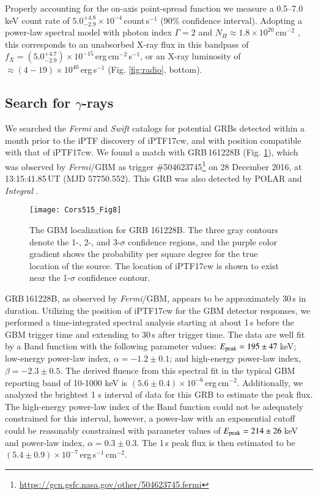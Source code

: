 \documentclass[twocolumn]{emulateapj}
\begin{document}
Properly accounting for the on-axis point-spread function we
measure a 0.5--7.0\,keV count rate of $5.0_{-2.9}^{+4.8} \times
10^{-4}$\,count\,s$^{-1}$ (90\% confidence interval).  Adopting a
power-law spectral model with photon index $\Gamma = 2$ and 
$N_H\approx 1.8\times10^{20}$\,cm$^{-2}$ \citep{Dickey1990}, this
corresponds to an unabsorbed X-ray flux in this bandpass of
$f_{X} = \left(5.0_{-2.9}^{+4.7}\right) \times 10^{-15}$\,erg\,cm$^{-2}$\,s$^{-1}$, or an X-ray luminosity of $\approx (4-19)\times10^{40}$\,erg\,s$^{-1}$  (Fig. \ref{fig:radio}, bottom).

\subsection{Search for $\gamma$-rays}
\label{gammarays}
We searched the \textit{Fermi} and \textit{Swift} catalogs for potential GRBs detected within a month prior to the iPTF discovery of iPTF17cw, and 
with position compatible with that of iPTF17cw. We found a match with GRB\,161228B (Fig. \ref{localization}), which was observed by \textit{Fermi}/GBM as trigger 
\#504623745\footnote{\url{https://gcn.gsfc.nasa.gov/other/504623745.fermi}} on 28 December 2016, at 13:15:41.85\,UT (MJD 57750.552). 
This GRB was also detected  by POLAR and \textit{Integral} \citep{GCN20348}.
\begin{figure}
\begin{center}
\vspace{-1.5cm}
\texttt{[image: Cors515\_Fig8]}
\vspace{-2cm}
\caption{The GBM localization for GRB 161228B.  The three gray contours denote the 1-, 2-, and 3-$\sigma$ confidence regions, and the purple color gradient shows the probability per square degree for the true location of the source.  The location of iPTF17cw is shown to exist near the 1-$\sigma$ confidence contour.\label{localization}}
\end{center}
\end{figure}

GRB\,161228B, as observed by \textit{Fermi}/GBM, appears to be approximately 30\,s in duration.  Utilizing the position of 
iPTF17cw for the GBM detector responses, we performed a time-integrated spectral analysis starting at about 1\,s before the 
GBM trigger time and extending to 30\,s after trigger time.  The data are well fit by a Band function \citep[defined as in][]{Gruber2014} with the following parameter 
values: $E_{\rm peak}= 195\pm47$\,keV; low-energy power-law index, $\alpha=-1.2\pm0.1$; and high-energy power-law index, 
$\beta=-2.3\pm0.5$.  The derived fluence from this spectral fit in the typical GBM reporting band of 10-1000 keV is $(5.6\pm0.4)\times10^{-6}$\,erg\,cm$^{-2}$.  
Additionally, we analyzed the brightest 1 s interval of data for this GRB to estimate the peak flux.  The high-energy power-law index 
of the Band function could not be adequately constrained for this interval, however, a power-law with an exponential cutoff could be 
reasonably constrained with parameter values of $E_{\rm peak} = 214 \pm 26$\,keV and power-law index, $\alpha=0.3\pm0.3$.  The 1\,s peak flux is 
then estimated to be $(5.4\pm0.9)\times10^{-7}$\,erg\,s$^{-1}$\,cm$^{-2}$.
\end{document}
